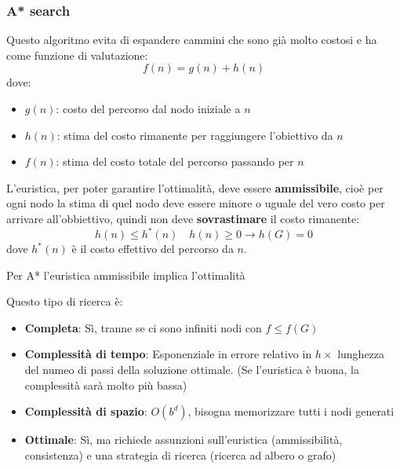 \documentclass[a4paper]{article}
\begin{document}
\subsubsection{A* search}
Questo algoritmo evita di espandere cammini che sono già molto costosi e ha come
funzione di valutazione:
\[
  f(n) = g(n) + h(n)
\] 
dove:
\begin{itemize}
  \item \( g(n) \): costo del percorso dal nodo iniziale a \( n \)
  \item \( h(n) \): stima del costo rimanente per raggiungere l'obiettivo da \( n \)
  \item \( f(n) \): stima del costo totale del percorso passando per \( n \)
\end{itemize}
L'euristica, per poter garantire l'ottimalità, deve essere \textbf{ammissibile}, cioè
per ogni nodo la stima di quel nodo deve essere minore o uguale del vero costo per arrivare
all'obbiettivo, quindi non deve \textbf{sovrastimare} il costo rimanente:
\[
  h(n) \le h^*(n) \quad h(n) \ge 0 \to h(G) = 0
\] 
dove \( h^*(n) \) è il costo effettivo del percorso da \( n \).
\begin{theorem}
  Per A* l'euristica ammissibile implica l'ottimalità
\end{theorem}
\noindent
Questo tipo di ricerca è:
\begin{itemize}
  \item \textbf{Completa}: Sì, tranne se ci sono infiniti nodi con \( f \le f(G) \) 
  \item \textbf{Complessità di tempo}: Esponenziale in errore relativo in \( h \times  \) 
    lunghezza del numeo di passi della soluzione ottimale. (Se l'euristica è buona, la
    complessità sarà molto più bassa)
  \item \textbf{Complessità di spazio}: \( O(b^d) \), bisogna memorizzare tutti i nodi
    generati
  \item \textbf{Ottimale}: Sì, ma richiede assunzioni sull'euristica (ammissibilità,
    consistenza) e una strategia di ricerca (ricerca ad albero o grafo)
\end{itemize}
\end{document}
